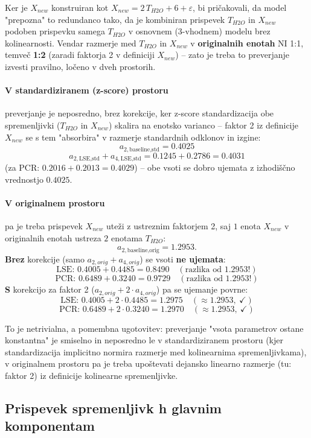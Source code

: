\documentclass[a4paper, 11pt]{article}
\begin{document}
Ker je $X_{new}$ konstruiran kot $X_{new} = 2\,T_{H2O} + 6 + \varepsilon$, bi
pričakovali, da model "prepozna" to redundanco tako, da je kombiniran prispevek
$T_{H2O}$ in $X_{new}$ podoben prispevku samega $T_{H2O}$ v osnovnem (3-vhodnem) modelu
brez kolinearnosti. Vendar razmerje med $T_{H2O}$ in $X_{new}$ v \textbf{originalnih
enotah} NI 1:1, temveč \textbf{1:2} (zaradi faktorja 2 v definiciji $X_{new}$) -- zato je
treba to preverjanje izvesti pravilno, ločeno v dveh prostorih.

\paragraph{V standardiziranem (z-score) prostoru} preverjanje je neposredno, brez
korekcije, ker z-score standardizacija obe spremenljivki ($T_{H2O}$ in $X_{new}$) skalira
na enotsko varianco -- faktor 2 iz definicije $X_{new}$ se s tem "absorbira" v razmerje
standardnih odklonov in izgine:
\[
a_{2,\text{baseline,std}} = 0.4025
\]
\[
a_{2,\text{LSE,std}} + a_{4,\text{LSE,std}} = 0.1245 + 0.2786 = 0.4031
\]
(za PCR: $0.2016 + 0.2013 = 0.4029$) -- obe vsoti se dobro ujemata z izhodiščno vrednostjo
$0.4025$.

\paragraph{V originalnem prostoru} pa je treba prispevek $X_{new}$ uteži z ustreznim
faktorjem 2, saj $1$ enota $X_{new}$ v originalnih enotah ustreza $2$ enotama $T_{H2O}$:
\[
a_{2,\text{baseline,orig}} = 1.2953 .
\]
\textbf{Brez} korekcije (samo $a_{2,orig}+a_{4,orig}$) se vsoti \textbf{ne ujemata}:
\[
\text{LSE: } 0.4005 + 0.4485 = 0.8490 \quad(\text{razlika od } 1.2953!)
\]
\[
\text{PCR: } 0.6489 + 0.3240 = 0.9729 \quad(\text{razlika od } 1.2953!)
\]
\textbf{S} korekcijo za faktor 2 ($a_{2,orig} + 2\cdot a_{4,orig}$) pa se ujemanje povrne:
\[
\text{LSE: } 0.4005 + 2\cdot 0.4485 = 1.2975 \quad(\approx 1.2953,\ \checkmark)
\]
\[
\text{PCR: } 0.6489 + 2\cdot 0.3240 = 1.2970 \quad(\approx 1.2953,\ \checkmark)
\]

To je netrivialna, a pomembna ugotovitev: preverjanje "vsota parametrov ostane
konstantna" je smiselno in neposredno le v standardiziranem prostoru (kjer
standardizacija implicitno normira razmerje med kolinearnima spremenljivkama), v
originalnem prostoru pa je treba upoštevati dejansko linearno razmerje (tu: faktor 2) iz
definicije kolinearne spremenljivke.

\subsection{Prispevek spremenljivk h glavnim komponentam}
\end{document}
